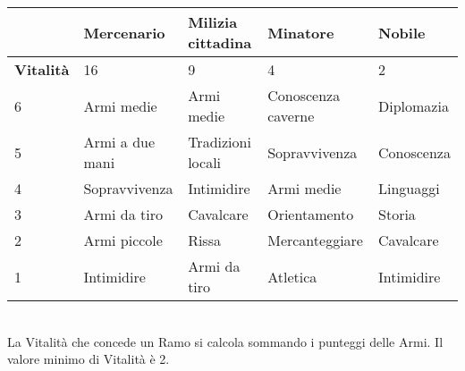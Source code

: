 \documentclass[12pt,a4paper,twoside,openany]{book}
\begin{document}
\begin{tabular}{|l|l|l|l|l|}
&\textbf{Mercenario}&\textbf{Milizia cittadina}&\textbf{Minatore}&\textbf{Nobile}\\\hline
\textbf{Vitalità}&16&9&4&2\\\hline		
6&Armi medie		&Armi medie		&Conoscenza	caverne	&Diplomazia\\
5&Armi a due mani	&Tradizioni locali&Sopravvivenza	&Conoscenza\\
4&Sopravvivenza		&Intimidire		&Armi medie			&Linguaggi\\
3&Armi da tiro		&Cavalcare		&Orientamento		&Storia\\
2&Armi piccole		&Rissa			&Mercanteggiare		&Cavalcare\\
1&Intimidire		&Armi da tiro	&Atletica			&Intimidire\\\hline
							
\end{tabular}	\\

La Vitalità che concede un Ramo si calcola sommando i punteggi delle Armi. Il valore minimo di Vitalità è 2.
\end{document}
